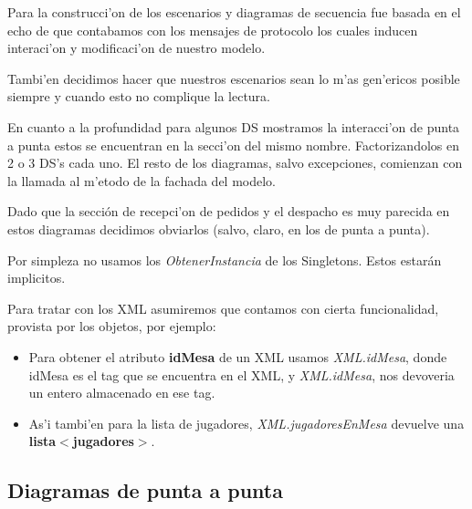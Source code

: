 Para la construcci'on de los escenarios y diagramas de secuencia fue basada en el echo de que contabamos con los mensajes de protocolo los cuales inducen interaci'on y modificaci'on de nuestro modelo.

Tambi'en decidimos hacer que nuestros escenarios sean lo m'as gen'ericos posible siempre y cuando esto no complique la lectura. 

En cuanto a la profundidad para algunos DS mostramos la interacci'on de punta 
a punta estos se encuentran en la secci'on del mismo nombre.
Factorizandolos en 2 o 3 DS's cada uno. El resto de los diagramas, salvo excepciones, comienzan con la llamada al m'etodo de la fachada del modelo.

Dado que la sección de recepci'on de pedidos y el despacho es muy parecida en estos diagramas 
decidimos obviarlos (salvo, claro, en los de punta a punta).


Por simpleza no usamos los \textit{ObtenerInstancia} de los Singletons. Estos estarán implicitos.


Para tratar con los XML asumiremos que contamos con cierta funcionalidad, provista por los objetos, por ejemplo:
\begin{itemize}
\item  Para obtener el atributo \textbf{idMesa} de un XML usamos \textit{XML.idMesa}, donde idMesa es el tag que se encuentra en el XML, y  \textit{XML.idMesa}, nos devoveria un entero almacenado en ese tag.

\item As'i tambi'en para la lista de jugadores, \textit{XML.jugadoresEnMesa} devuelve una \textbf{lista$<$jugadores$>$}.
\end{itemize}

% 
% 
% 
% 

\subsection{Diagramas de punta a punta}

